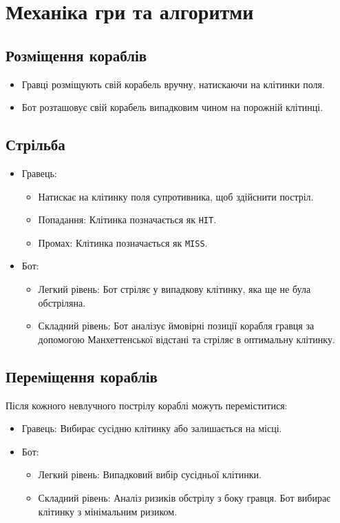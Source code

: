 \documentclass[12pt]{article}
\begin{document}
\section{Механіка гри та алгоритми}
\subsection{Розміщення кораблів}
\begin{itemize}
    \item Гравці розміщують свій корабель вручну, натискаючи на клітинки поля.
    \item Бот розташовує свій корабель випадковим чином на порожній клітинці.
\end{itemize}

\subsection{Стрільба}
\begin{itemize}
    \item Гравець:
    \begin{itemize}
        \item Натискає на клітинку поля супротивника, щоб здійснити постріл.
        \item Попадання: Клітинка позначається як \texttt{HIT}.
        \item Промах: Клітинка позначається як \texttt{MISS}.
    \end{itemize}
    \item Бот:
    \begin{itemize}
        \item Легкий рівень: Бот стріляє у випадкову клітинку, яка ще не була обстріляна.
        \item Складний рівень: Бот аналізує ймовірні позиції корабля гравця за допомогою Манхеттенської відстані та стріляє в оптимальну клітинку.
    \end{itemize}
\end{itemize}

\subsection{Переміщення кораблів}
Після кожного невлучного пострілу кораблі можуть переміститися:
\begin{itemize}
    \item Гравець: Вибирає сусідню клітинку або залишається на місці.
    \item Бот:
    \begin{itemize}
        \item Легкий рівень: Випадковий вибір сусідньої клітинки.
        \item Складний рівень: Аналіз ризиків обстрілу з боку гравця. Бот вибирає клітинку з мінімальним ризиком.
    \end{itemize}
\end{itemize}
\end{document}
